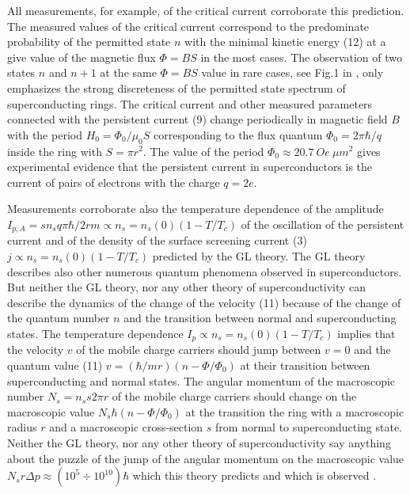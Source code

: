 \documentclass[twocolumn,secnumarabic,amssymb, nobibnotes, aps, prd]{revtex4}
\begin{document}
All measurements, for example, of the critical current \cite{JETP2007,JETP07J,PLA2020} corroborate this prediction. The measured values of the critical current \cite{JETP2007,JETP07J,PLA2020} correspond to the predominate probability of the permitted state $n$ with the minimal kinetic energy (12) at a give value of the magnetic flux $\Phi = BS$ in the most cases. The observation of two states $n$ and $n+1$ at the same $\Phi = BS$ value in rare cases, see Fig.1 in \cite{PLA2020}, only emphasizes the strong discreteness of the permitted state spectrum of superconducting rings. The critical current \cite{JETP2007,JETP07J,PLA2020} and other measured parameters \cite{Physica2019,PLA2012Ex,Letter2007,JETP2007,Letter2003} connected with the persistent current (9) change periodically in magnetic field $B$ with the period $H_{0} = \Phi _{0}/\mu_{0}S$ corresponding to the flux quantum $\Phi _{0} = 2\pi \hbar /q$ inside the ring with $S = \pi r^{2}$. The value of the period $\Phi _{0} \approx 20.7 \ Oe \ \mu m^{2}$ gives experimental evidence that the persistent current in superconductors is the current of pairs of electrons with the charge $q = 2e$.        

Measurements corroborate also the temperature dependence of the amplitude $I_{p,A} = sn_{s}q\pi \hbar/2rm \propto n_{s} = n_{s}(0)(1-T/T_{c})$ of the oscillation of the persistent current and of the density of the surface screening current (3) $j  \propto n_{s}= n_{s}(0)(1-T/T_{c})$ predicted by the GL theory. The GL theory describes also other numerous quantum phenomena observed in superconductors. But neither the GL theory, nor any other theory of superconductivity can describe the dynamics of the change of the velocity (11) because of the change of the quantum number $n$ and the transition between normal and superconducting states. The temperature dependence $I_{p} \propto n_{s} = n_{s}(0)(1-T/T_{c})$ implies that the velocity $v$ of the mobile charge carriers should jump between $v = 0$ and the quantum value (11) $v  =  (\hbar /mr)(n - \Phi /\Phi_{0})$ at their transition between superconducting and normal states. The angular momentum of the macroscopic number $N_{s} = n_{s}s2\pi r$ of the mobile charge carriers should change on the macroscopic value $N_{s}\hbar (n - \Phi /\Phi_{0})$ at the transition the ring with a macroscopic radius $r$ and a macroscopic cross-section $s$ from normal to superconducting state. Neither the GL theory, nor any other theory of superconductivity say anything about the puzzle of the jump of the angular momentum on the macroscopic value $N_{s} r\Delta p \approx  (10^{5} \div 10^{10})\hbar $ which this theory predicts and which is observed \cite{NanoLet2017}. 
\end{document}
